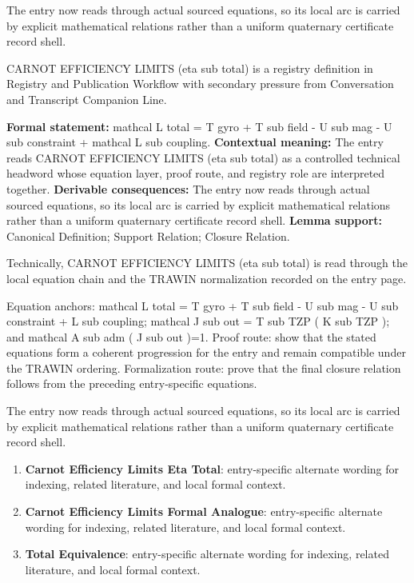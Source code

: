 The entry now reads through actual sourced equations, so its local arc is carried by explicit mathematical relations rather than a uniform quaternary certificate record shell.
\clearpage


\begingroup\small
{}
CARNOT EFFICIENCY LIMITS (eta sub total) is a registry definition in Registry and Publication Workflow with secondary pressure from Conversation and Transcript Companion Line.

\begingroup\footnotesize\setlength{\emergencystretch}{3em}\sloppy
\textbf{Formal statement:} mathcal L total = T gyro + T sub field - U sub mag - U sub constraint + mathcal L sub coupling. \textbf{Contextual meaning:} The entry reads CARNOT EFFICIENCY LIMITS (eta sub total) as a controlled technical headword whose equation layer, proof route, and registry role are interpreted together. \textbf{Derivable consequences:} The entry now reads through actual sourced equations, so its local arc is carried by explicit mathematical relations rather than a uniform quaternary certificate record shell. \textbf{Lemma support:} Canonical Definition; Support Relation; Closure Relation.\par
\endgroup

Technically, CARNOT EFFICIENCY LIMITS (eta sub total) is read through the local equation chain and the TRAWIN normalization recorded on the entry page.

Equation anchors: mathcal L total = T gyro + T sub field - U sub mag - U sub constraint + L sub coupling; mathcal J sub out = T sub TZP ( K sub TZP ); and mathcal A sub adm ( J sub out )=1. Proof route: show that the stated equations form a coherent progression for the entry and remain compatible under the TRAWIN ordering. Formalization route: prove that the final closure relation follows from the preceding entry-specific equations.

The entry now reads through actual sourced equations, so its local arc is carried by explicit mathematical relations rather than a uniform quaternary certificate record shell.
\endgroup

\begin{enumerate}[leftmargin=1.6em,itemsep=6pt,topsep=4pt]
\item \textbf{Carnot Efficiency Limits Eta Total}: entry-specific alternate wording for indexing, related literature, and local formal context.
\item \textbf{Carnot Efficiency Limits Formal Analogue}: entry-specific alternate wording for indexing, related literature, and local formal context.
\item \textbf{Total Equivalence}: entry-specific alternate wording for indexing, related literature, and local formal context.
\end{enumerate}

